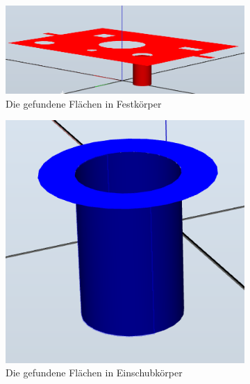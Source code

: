 \documentclass[14pt,a4paper,titlepage]{article}
\begin{document}
			\begin{figure}[t!]
			\centering
			\begin{subfigure}{0.3\linewidth}
				\includegraphics[width=\linewidth]{basefaces4.png}
				\caption{Die gefundene Flächen in Festkörper}
			\end{subfigure}
			\begin{subfigure}{0.3\linewidth}
				\includegraphics[width=\linewidth]{insertfaces4.png}
				\caption{Die gefundene Flächen in Einschubkörper}
			\end{subfigure}	
			\begin{subfigure}{0.3\linewidth}

\end{subfigure}
\end{figure}
\end{document}
